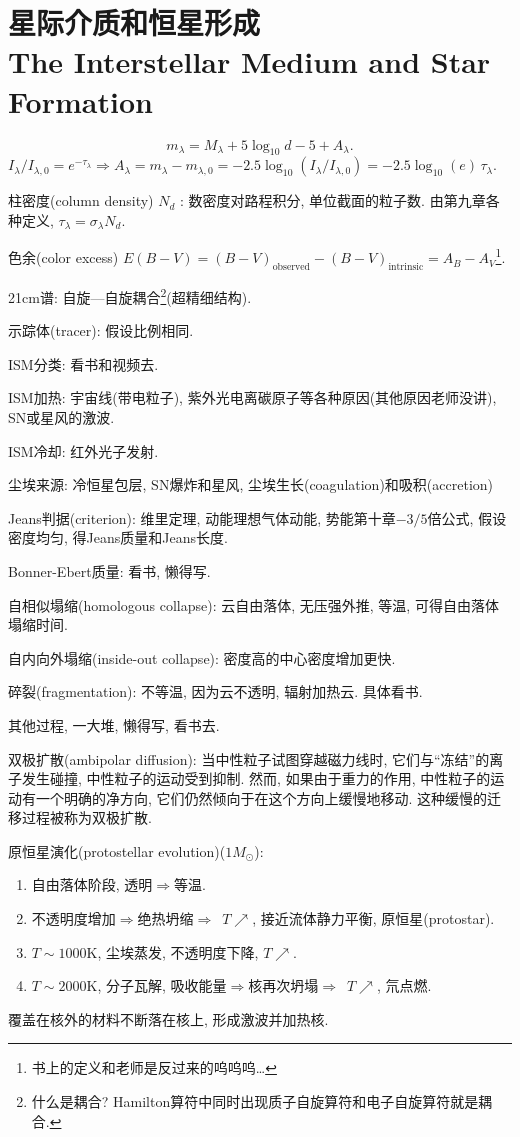 \chapter{星际介质和恒星形成\\The Interstellar Medium and Star Formation}

\begin{equation*}
    m_\lambda=M_\lambda+5\log_{10}d-5+A_\lambda.
\end{equation*}
$I_\lambda/I_{\lambda,0}=e^{-\tau_\lambda}\Rightarrow A_\lambda=m_\lambda-m_{\lambda,0}=-2.5\log_{10}(I_\lambda/I_{\lambda,0})=-2.5\log_{10}(e)\,\tau_\lambda$.

柱密度(column density) $N_{d}$ : 数密度对路程积分, 单位截面的粒子数. 由第九章各种定义, $\tau_\lambda=\sigma_\lambda N_{d}$.

色余(color excess) $E(B-V)=(B-V)_\text{observed}-(B-V)_\text{intrinsic}=A_B-A_V$\footnote{书上的定义和老师是反过来的呜呜呜\dots}.

21cm谱: 自旋---自旋耦合\footnote{什么是耦合? Hamilton算符中同时出现质子自旋算符和电子自旋算符就是耦合.}(超精细结构).

示踪体(tracer): 假设比例相同.

ISM分类: 看书和视频去.

ISM加热: 宇宙线(带电粒子), 紫外光电离碳原子等各种原因(其他原因老师没讲), SN或星风的激波.

ISM冷却: 红外光子发射.

尘埃来源: 冷恒星包层, SN爆炸和星风, 尘埃生长(coagulation)和吸积(accretion)

Jeans判据(criterion): 维里定理, 动能理想气体动能, 势能第十章$-3/5$倍公式, 假设密度均匀, 得Jeans质量和Jeans长度.

Bonner-Ebert质量: 看书, 懒得写.

自相似塌缩(homologous collapse): 云自由落体, 无压强外推, 等温, 可得自由落体塌缩时间.

自内向外塌缩(inside-out collapse): 密度高的中心密度增加更快.

碎裂(fragmentation): 不等温, 因为云不透明, 辐射加热云. 具体看书.

其他过程, 一大堆, 懒得写, 看书去.

双极扩散(ambipolar diffusion): 当中性粒子试图穿越磁力线时, 它们与``冻结''的离子发生碰撞, 中性粒子的运动受到抑制. 然而, 如果由于重力的作用, 中性粒子的运动有一个明确的净方向, 它们仍然倾向于在这个方向上缓慢地移动. 这种缓慢的迁移过程被称为双极扩散.

原恒星演化(protostellar evolution)($1M_\odot$): 
\begin{enumerate}
    \item 自由落体阶段, 透明$\Longrightarrow$等温.
    \item 不透明度增加$\Longrightarrow$绝热坍缩$\Longrightarrow$~$T\nearrow$, 接近流体静力平衡, 原恒星(protostar).
    \item $T\sim1000\text{K}$, 尘埃蒸发, 不透明度下降, $T\nearrow$.
    \item $T\sim2000\text{K}$, 分子瓦解, 吸收能量$\Longrightarrow$核再次坍塌$\Longrightarrow$~$T\nearrow$, 氘点燃.
\end{enumerate}
覆盖在核外的材料不断落在核上, 形成激波并加热核.


